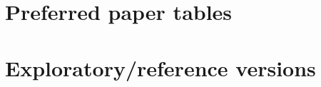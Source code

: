 \documentclass[11pt]{article}
\begin{document}
\section*{Preferred paper tables}

\begin{table}[htbp]
\scriptsize

\end{table}

\clearpage

\begin{table}[htbp]
\scriptsize

\end{table}

\clearpage

\section*{Exploratory/reference versions}

\begin{landscape}
\begin{table}[htbp]
\tiny

\end{table}
\end{landscape}

\clearpage

\begin{table}[htbp]
\scriptsize

\end{table}
\end{document}
